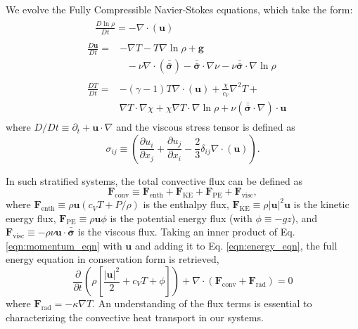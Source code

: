 \documentclass[aps, prl, twocolumn, groupedaddress, amsfonts, amssymb, amsmath]{revtex4-1}
\newcommand{\Div}[1]{\ensuremath{\nabla\cdot\left( #1\right)}}
\newcommand{\grad}{\ensuremath{\nabla}}
\newcommand{\lilstressT}{\ensuremath{\bm{\bar{\bar{\sigma}}}}}
\begin{document}
We evolve the Fully Compressible Navier-Stokes equations,
which take the form:
\begin{align}
&\begin{aligned}
&\frac{D \ln\rho}{D t} = -\Div{\bm{u}}
	\label{eqn:continuity_eqn}
\end{aligned}\\
&\begin{aligned}
\frac{D\bm{u}}{D t}=
&-\grad T - T\grad\ln\rho + \bm{g} \\
&\,\,\,\,-\nu\Div{\lilstressT} - \lilstressT\cdot\grad\nu - \nu\lilstressT\cdot\grad\ln\rho
\label{eqn:momentum_eqn}
\end{aligned}\\
&\begin{aligned}
\frac{D T}{D t} = &-(\gamma-1)T\Div{\bm{u}} + \frac{\chi}{c_V}\grad^2 T + \\
&\grad T \cdot \grad\chi + \chi\grad T \cdot\grad\ln\rho +\nu\left(\lilstressT\cdot\nabla\right)\cdot\bm{u} 
	\label{eqn:energy_eqn}
\end{aligned}
\end{align}
where $D/Dt \equiv \partial_t + \bm{u}\cdot\grad$ and the viscous stress tensor is defined as
\begin{equation}
\sigma_{ij} \equiv \left(\frac{\partial u_i}{\partial x_j} + \frac{\partial u_j}{\partial x_i} - \frac{2}{3}\delta_{ij}\Div{\bm{u}}\right).
	\label{eqn:stress_tensor}
\end{equation}

In such stratified systems, the total convective flux can be defined as
\begin{equation}
\bm{F}_{\text{conv}} \equiv \bm{F}_{\text{enth}} + \bm{F}_{\text{KE}} + \bm{F}_{\text{PE}} + \bm{F}_{\text{visc}},
\end{equation}
where $\bm{F}_{\text{enth}} \equiv \rho\bm{u}(c_V T + P/\rho)$ is the enthalpy flux, $\bm{F}_{\text{KE}} \equiv 
\rho|\bm{u}|^2\bm{u}$ is the kinetic energy flux, $\bm{F}_{\text{PE}} \equiv \rho\bm{u}\phi$ is the potential
energy flux (with $\phi \equiv -gz$), 
and $\bm{F}_{\text{visc}} \equiv -\rho\nu\bm{u}\cdot\lilstressT$ is the viscous flux.  Taking an inner product of
Eq. \ref{eqn:momentum_eqn} with $\bm{u}$ and adding it to 
Eq. \ref{eqn:energy_eqn}, the full energy equation in conservation form is retrieved,
\begin{equation}
\frac{\partial}{\partial t}\left(\rho\left[\frac{|\bm{u}|^2}{2} + c_V T + \phi\right]\right) +
\Div{\bm{F}_{\text{conv}} + \bm{F}_{\text{rad}}} = 0
	\label{eqn:energy_eqn_full}
\end{equation}
where $\bm{F}_{\text{rad}} = -\kappa \grad T$.  An understanding of the flux terms is essential to characterizing
the convective heat transport in our systems.
\end{document}
